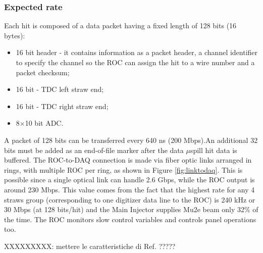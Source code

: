 \subsubsection{Expected rate}





Each hit is composed of a data packet having a fixed length of 128 bits (16 bytes):
\begin{itemize}
    \item 16 bit header - it contains information as a packet header, a channel identifier to specify the channel so the ROC can assign the hit to a wire number and a packet checksum;
    \item 16 bit - TDC left straw end;
    \item 16 bit - TDC right straw end;
    \item 8$\times$10 bit ADC.
\end{itemize}
A packet of 128 bits can be transferred every 640 ns (200 Mbps).An additional 32
bits must be added as an end-of-file marker after the data $\mu$spill hit data is buffered.
The ROC-to-DAQ connection is made via fiber optic links arranged in rings, with multiple ROC per ring, as shown in Figure \ref{fig:linktodaq}. This is possible since a single optical link can handle 2.6 Gbps, while the ROC output is around 230 Mbps. This value comes from the fact that the highest rate for any 4 straws group (corresponding to one digitizer data line to the ROC) is 240 kHz or 30 Mbps (at 128 bits/hit) and the Main Injector supplies Mu2e beam only 32\% of the time. The ROC monitors slow control variables and controls panel operations too.


XXXXXXXXX: mettere le caratteristiche di Ref. \cite{vadi}  ?????
